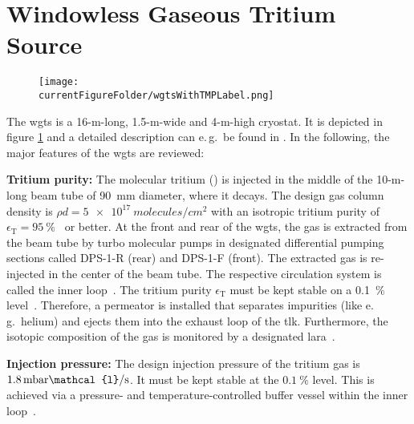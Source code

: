 \section{Windowless Gaseous Tritium Source}
\label{sec:katrinExpSetupWGTS}
\begin{figure}
    \centering    \texttt{[image: \\currentFigureFolder/wgtsWithTMPLabel.png]}
    \label{fig:katrinExpSetupWGTS}
\end{figure}%
The \gls{wgts} is a 16-m-long, 1.5-m-wide and 4-m-high cryostat. It is depicted in figure \ref{fig:katrinExpSetupWGTS} and a detailed description can e.\,g.~be found in \cite{Grohman2008,Babutzka2012}. In the following, the major features of the \gls{wgts} are reviewed:

{\par\textbf{Tritium purity:} 
The molecular tritium () is injected in the middle of the 10-m-long beam tube of \SI{90}{mm} diameter, where it decays. The design gas column density is $\rho d = \SI{5e17}{molecules/{cm}^2}$ with an isotropic tritium purity of $\epsilon_\text{T} = \SI{95}{\percent}$~\cite{Angrik:2005ep} or better. At the front and rear of the \gls{wgts}, the gas is extracted from the beam tube by turbo molecular pumps in designated differential pumping sections called DPS-1-R (rear) and DPS-1-F (front). The extracted gas is re-injected in the center of the beam tube. The respective circulation system is called the inner loop~\cite{PRIESTER201542}. The tritium purity $\epsilon_\text{T}$ must be kept stable on a \SI{0.1}{\percent} level~\cite{Angrik:2005ep}. Therefore, a permeator is installed that separates impurities (like e.\,g.~helium) and ejects them into the exhaust loop of the \gls{tlk}. Furthermore, the isotopic composition of the gas
is monitored by a designated \gls{lara}~\cite{Schloesser2013}.}

{\par\textbf{Injection pressure:}
The design injection pressure of the tritium gas is $1.8\text{\,mbar}\mathcal{l}/\text{s}$. It must be kept stable at the $\SI{0.1}{\percent}$ level. This is achieved via a pressure- and temperature-controlled buffer vessel within the inner loop~\cite{PRIESTER201542}.}

